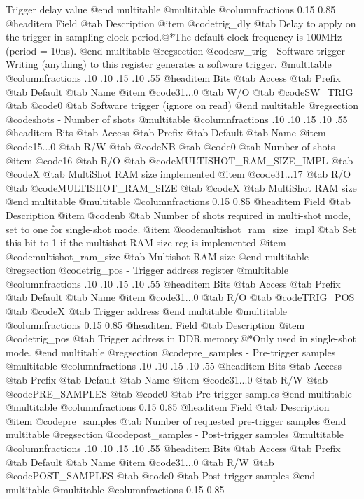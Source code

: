 Trigger delay value
@end multitable
@multitable @columnfractions 0.15 0.85
@headitem Field @tab Description
@item @code{trig_dly} @tab Delay to apply on the trigger in sampling clock period.@*The default clock frequency is 100MHz (period = 10ns).
@end multitable
@regsection @code{sw_trig} - Software trigger
Writing (anything) to this register generates a software trigger.
@multitable @columnfractions .10 .10 .15 .10 .55
@headitem Bits @tab Access @tab Prefix @tab Default @tab Name
@item @code{31...0}
@tab W/O @tab
@code{SW_TRIG}
@tab @code{0} @tab 
Software trigger (ignore on read)
@end multitable
@regsection @code{shots} - Number of shots
@multitable @columnfractions .10 .10 .15 .10 .55
@headitem Bits @tab Access @tab Prefix @tab Default @tab Name
@item @code{15...0}
@tab R/W @tab
@code{NB}
@tab @code{0} @tab 
Number of shots
@item @code{16}
@tab R/O @tab
@code{MULTISHOT_RAM_SIZE_IMPL}
@tab @code{X} @tab 
MultiShot RAM size implemented
@item @code{31...17}
@tab R/O @tab
@code{MULTISHOT_RAM_SIZE}
@tab @code{X} @tab 
MultiShot RAM size
@end multitable
@multitable @columnfractions 0.15 0.85
@headitem Field @tab Description
@item @code{nb} @tab Number of shots required in multi-shot mode, set to one for single-shot mode.
@item @code{multishot_ram_size_impl} @tab Set this bit to 1 if the multishot RAM size reg is implemented
@item @code{multishot_ram_size} @tab Multishot RAM size
@end multitable
@regsection @code{trig_pos} - Trigger address register
@multitable @columnfractions .10 .10 .15 .10 .55
@headitem Bits @tab Access @tab Prefix @tab Default @tab Name
@item @code{31...0}
@tab R/O @tab
@code{TRIG_POS}
@tab @code{X} @tab 
Trigger address
@end multitable
@multitable @columnfractions 0.15 0.85
@headitem Field @tab Description
@item @code{trig_pos} @tab Trigger address in DDR memory.@*Only used in single-shot mode.
@end multitable
@regsection @code{pre_samples} - Pre-trigger samples
@multitable @columnfractions .10 .10 .15 .10 .55
@headitem Bits @tab Access @tab Prefix @tab Default @tab Name
@item @code{31...0}
@tab R/W @tab
@code{PRE_SAMPLES}
@tab @code{0} @tab 
Pre-trigger samples
@end multitable
@multitable @columnfractions 0.15 0.85
@headitem Field @tab Description
@item @code{pre_samples} @tab Number of requested pre-trigger samples
@end multitable
@regsection @code{post_samples} - Post-trigger samples
@multitable @columnfractions .10 .10 .15 .10 .55
@headitem Bits @tab Access @tab Prefix @tab Default @tab Name
@item @code{31...0}
@tab R/W @tab
@code{POST_SAMPLES}
@tab @code{0} @tab 
Post-trigger samples
@end multitable
@multitable @columnfractions 0.15 0.85
